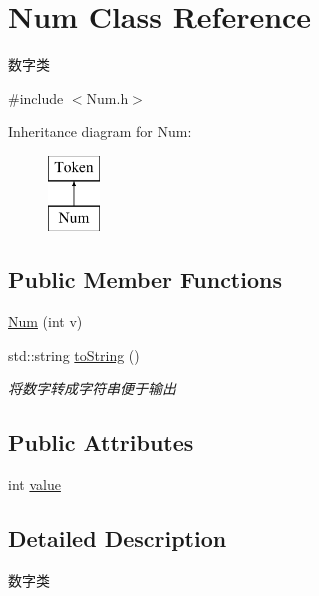 \hypertarget{class_num}{}\section{Num Class Reference}
\label{class_num}


数字类  




{\ttfamily \#include $<$Num.\+h$>$}

Inheritance diagram for Num\+:\begin{figure}[H]
\begin{center}
\leavevmode
\includegraphics[height=2.000000cm]{class_num}
\end{center}
\end{figure}
\subsection*{Public Member Functions}
\begin{DoxyCompactItemize}
\item 
\hyperlink{class_num_afc0c5a6bc449547b300aa036e70eda2d}{Num} (int v)
\item 
\mbox{\label{class_num_aec8ab507b42f2080a8cc197f45f0c935}} 
std\+::string \hyperlink{class_num_aec8ab507b42f2080a8cc197f45f0c935}{to\+String} ()
\begin{DoxyCompactList}\small\item\em 将数字转成字符串便于输出 \end{DoxyCompactList}\end{DoxyCompactItemize}
\subsection*{Public Attributes}
\begin{DoxyCompactItemize}
\item 
int \hyperlink{class_num_a40cb04ca1ed295495a2e4b358b984fb8}{value}
\end{DoxyCompactItemize}


\subsection{Detailed Description}
数字类 

